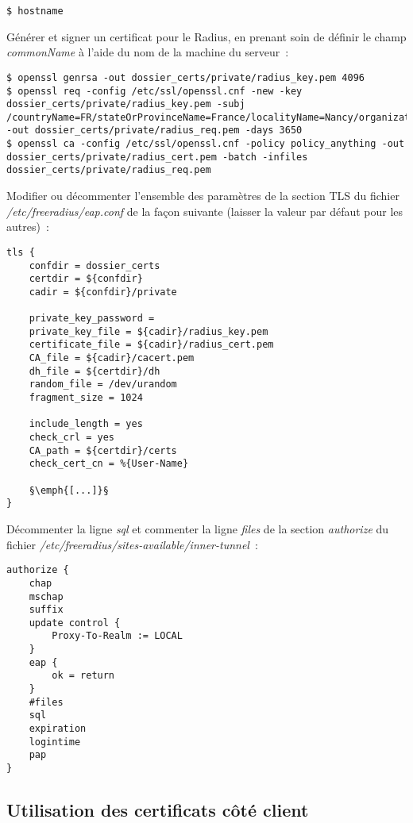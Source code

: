 \begin{lstlisting}
$ hostname
\end{lstlisting}

Générer et signer un certificat pour le Radius, en prenant soin de définir le champ \emph{commonName} à l'aide du nom de la machine du serveur~:

\begin{lstlisting}
$ openssl genrsa -out dossier_certs/private/radius_key.pem 4096
$ openssl req -config /etc/ssl/openssl.cnf -new -key dossier_certs/private/radius_key.pem -subj /countryName=FR/stateOrProvinceName=France/localityName=Nancy/organizationName=BHConsulting/commonName=nom_serveur_radius/ -out dossier_certs/private/radius_req.pem -days 3650
$ openssl ca -config /etc/ssl/openssl.cnf -policy policy_anything -out dossier_certs/private/radius_cert.pem -batch -infiles dossier_certs/private/radius_req.pem
\end{lstlisting}

Modifier ou décommenter l'ensemble des paramètres de la section TLS du fichier \emph{/etc/freeradius/eap.conf} de la façon suivante (laisser la valeur par défaut pour les autres)~:

\begin{lstlisting}
tls {
	confdir = dossier_certs 
	certdir = ${confdir}
	cadir = ${confdir}/private

	private_key_password =
	private_key_file = ${cadir}/radius_key.pem
	certificate_file = ${cadir}/radius_cert.pem
	CA_file = ${cadir}/cacert.pem
	dh_file = ${certdir}/dh
	random_file = /dev/urandom
	fragment_size = 1024

	include_length = yes
	check_crl = yes
	CA_path = ${certdir}/certs
	check_cert_cn = %{User-Name}

	§\emph{[...]}§
}
\end{lstlisting}

Décommenter la ligne \emph{sql} et commenter la ligne \emph{files} de la section \emph{authorize} du fichier \emph{/etc/freeradius/sites-available/inner-tunnel}~:

\begin{lstlisting}
authorize {
    chap
    mschap
    suffix
    update control {
        Proxy-To-Realm := LOCAL
    }
    eap {
        ok = return
    }
    #files
    sql
    expiration
    logintime
    pap
}
\end{lstlisting}

\subsection{Utilisation des certificats côté client}

